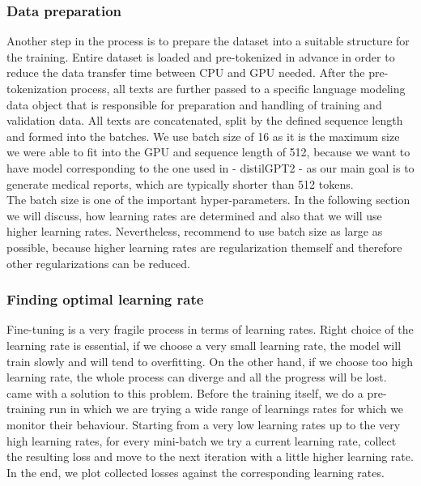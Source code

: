 \subsubsection*{Data preparation}
Another step in the process is to prepare the dataset into a suitable structure for the training. Entire dataset is loaded and pre-tokenized in advance in order to reduce the data transfer time between CPU and GPU needed. After the pre-tokenization process, all texts are further passed to a specific language modeling data object that is responsible for preparation and handling of training and validation data. All texts are concatenated, split by the defined sequence length and formed into the batches. We use batch size of 16 as it is the maximum size we were able to fit into the GPU and sequence length of 512, because we want to have model corresponding to the one used in \citet{alfarghaly2021automated} - distilGPT2 - as our main goal is to generate medical reports, which are typically shorter than 512 tokens.\\

The batch size is one of the important hyper-parameters. In the following section we will discuss, how learning rates are determined and also that we will use higher learning rates. Nevertheless, \citet{smith2018disciplined} recommend to use batch size as large as possible, because higher learning rates are regularization themself and therefore other regularizations can be reduced.

\subsubsection*{Finding optimal learning rate}
Fine-tuning is a very fragile process in terms of learning rates. Right choice of the learning rate is essential, if we choose a very small learning rate, the model will train slowly and will tend to overfitting. On the other hand, if we choose too high learning rate, the whole process can diverge and all the progress will be lost.\\

\citet{smith2017cyclical} came with a solution to this problem. Before the training itself, we do a pre-training run in which we are trying a wide range of learnings rates for which we monitor their behaviour. Starting from a very low learning rates up to the very high learning rates, for every mini-batch we try a current learning rate, collect the resulting loss and move to the next iteration with a little higher learning rate. In the end, we plot collected losses against the corresponding learning rates.\\

